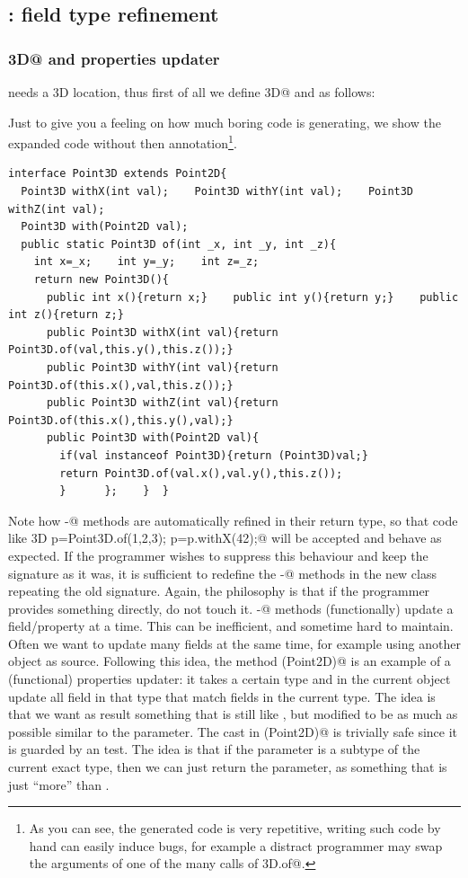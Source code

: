\subsection{\Q@Bird@:  field type refinement}

\subsubsection*{\Q@Point3D@ and properties updater}
\Q@Bird@ needs a 3D location, thus first of all we define \Q@Point3D@ and
as follows:

Just to give you a feeling on how much boring code \mixin is generating,  we show the expanded code without then \mixin annotation\footnote{
As you can see, the generated code is very repetitive, writing such code by hand can easily induce bugs, for example a distract programmer may
swap the arguments of one of the many calls of \Q@Point3D.of@.
}.\begin{lstlisting}
interface Point3D extends Point2D{
  Point3D withX(int val);    Point3D withY(int val);    Point3D withZ(int val);
  Point3D with(Point2D val);
  public static Point3D of(int _x, int _y, int _z){
    int x=_x;    int y=_y;    int z=_z;
    return new Point3D(){
      public int x(){return x;}    public int y(){return y;}    public int z(){return z;}
      public Point3D withX(int val){return Point3D.of(val,this.y(),this.z());}
      public Point3D withY(int val){return Point3D.of(this.x(),val,this.z());}
      public Point3D withZ(int val){return Point3D.of(this.x(),this.y(),val);}
      public Point3D with(Point2D val){
        if(val instanceof Point3D){return (Point3D)val;}
        return Point3D.of(val.x(),val.y(),this.z());
        }      };    }  }
\end{lstlisting}
Note how \Q@with-@ methods are automatically refined in their return type, so that code like 
\Q@Point3D p=Point3D.of(1,2,3); p=p.withX(42);@ will be accepted and behave as expected. If the programmer wishes to suppress this behaviour and keep the signature as it was, it is sufficient to redefine the \Q@with-@ methods in the new class repeating the old signature.
Again, the philosophy is that if the programmer provides something directly, \mixin do not touch it.
\Q@with-@ methods (functionally) update a field/property at a time.
This can be inefficient, and sometime hard to maintain.
Often we want to update many fields at the same time, for example using another object as source.
Following this idea, the method \Q@with(Point2D)@ is an example of a (functional) properties updater: 
it takes a certain type and in the current object update all field in that type that match fields in the current type.
The idea is that we want as result something that is still like \Q@this@, but modified to be as much as possible similar to the parameter.
The cast in \Q@with(Point2D)@ is trivially safe since it is guarded by an \Q@instanceof@ test. The idea is that if the parameter is a subtype of the current exact type, then we can just return the parameter, as something that is just ``more'' than \Q@this@.

